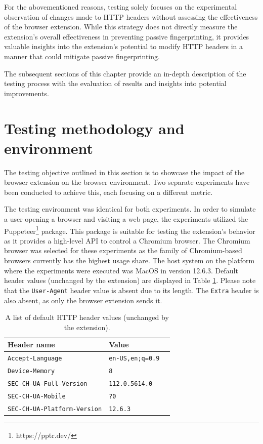 For the abovementioned reasons, testing solely focuses on the experimental observation of changes made to HTTP headers without assessing the effectiveness of the browser extension. While this strategy does not directly measure the extension's overall effectiveness in preventing passive fingerprinting, it provides valuable insights into the extension's potential to modify HTTP headers in a manner that could mitigate passive fingerprinting.

The subsequent sections of this chapter provide an in-depth description of the testing process with the evaluation of results and insights into potential improvements.

\section{Testing methodology and environment}
\label{Section:TestingMethodologyEnv}

The testing objective outlined in this section is to showcase the impact of the browser extension on the browser environment. Two separate experiments have been conducted to achieve this, each focusing on a different metric.

The testing environment was identical for both experiments. In order to simulate a user opening a browser and visiting a web page, the experiments utilized the Puppeteer\footnote{https://pptr.dev/} package. This package is suitable for testing the extension's behavior as it provides a high-level API to control a Chromium browser. The Chromium browser was selected for these experiments as the family of Chromium-based browsers currently has the highest usage share. The host system on the platform where the experiments were executed was MacOS in version 12.6.3. Default header values (unchanged by the extension) are displayed in Table \ref{Table:DefaultHeaderValues}. Please note that the \texttt{User-Agent} header value is absent due to its length. The \texttt{Extra} header is also absent, as only the browser extension sends it.

\begin{table}[H]
	\centering
	\begin{tabular}{lll}
		\toprule
		Header name                         & Value \\
		\midrule
		\texttt{Accept-Language}            & \verb|en-US,en;q=0.9| \\
		\texttt{Device-Memory}              & \verb|8| \\
		\texttt{SEC-CH-UA-Full-Version}     & \verb|112.0.5614.0| \\
		\texttt{SEC-CH-UA-Mobile}           & \verb|?0| \\
		\texttt{SEC-CH-UA-Platform-Version} & \verb|12.6.3| \\
		\bottomrule                               
	\end{tabular}
	
	\caption{A list of default HTTP header values (unchanged by the extension).}
	\label{Table:DefaultHeaderValues}
\end{table}

